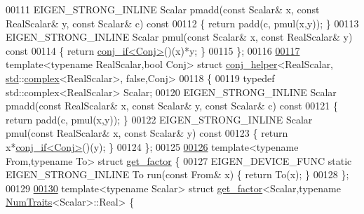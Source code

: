 \begin{DoxyCode}
00111   EIGEN\_STRONG\_INLINE Scalar pmadd(\textcolor{keyword}{const} Scalar& x, \textcolor{keyword}{const} RealScalar& y, \textcolor{keyword}{const} Scalar& c)\textcolor{keyword}{ const}
00112 \textcolor{keyword}{  }\{ \textcolor{keywordflow}{return} padd(c, pmul(x,y)); \}
00113   EIGEN\_STRONG\_INLINE Scalar pmul(\textcolor{keyword}{const} Scalar& x, \textcolor{keyword}{const} RealScalar& y)\textcolor{keyword}{ const}
00114 \textcolor{keyword}{  }\{ \textcolor{keywordflow}{return} \hyperlink{struct_eigen_1_1internal_1_1conj__if}{conj\_if<Conj>}()(x)*y; \}
00115 \};
00116 
\hyperlink{struct_eigen_1_1internal_1_1conj__helper_3_01_real_scalar_00_01std_1_1complex_3_01_real_scalar_01_4_00_01false_00_01_conj_01_4}{00117} \textcolor{keyword}{template}<\textcolor{keyword}{typename} RealScalar,\textcolor{keywordtype}{bool} Conj> \textcolor{keyword}{struct }\hyperlink{struct_eigen_1_1internal_1_1conj__helper}{conj\_helper}<RealScalar, 
      \hyperlink{namespacestd}{std}::\hyperlink{structcomplex}{complex}<RealScalar>, false,Conj>
00118 \{
00119   \textcolor{keyword}{typedef} std::complex<RealScalar> Scalar;
00120   EIGEN\_STRONG\_INLINE Scalar pmadd(\textcolor{keyword}{const} RealScalar& x, \textcolor{keyword}{const} Scalar& y, \textcolor{keyword}{const} Scalar& c)\textcolor{keyword}{ const}
00121 \textcolor{keyword}{  }\{ \textcolor{keywordflow}{return} padd(c, pmul(x,y)); \}
00122   EIGEN\_STRONG\_INLINE Scalar pmul(\textcolor{keyword}{const} RealScalar& x, \textcolor{keyword}{const} Scalar& y)\textcolor{keyword}{ const}
00123 \textcolor{keyword}{  }\{ \textcolor{keywordflow}{return} x*\hyperlink{struct_eigen_1_1internal_1_1conj__if}{conj\_if<Conj>}()(y); \}
00124 \};
00125 
\hyperlink{struct_eigen_1_1internal_1_1get__factor}{00126} \textcolor{keyword}{template}<\textcolor{keyword}{typename} From,\textcolor{keyword}{typename} To> \textcolor{keyword}{struct }\hyperlink{struct_eigen_1_1internal_1_1get__factor}{get\_factor} \{
00127   EIGEN\_DEVICE\_FUNC \textcolor{keyword}{static} EIGEN\_STRONG\_INLINE To run(\textcolor{keyword}{const} From& x) \{ \textcolor{keywordflow}{return} To(x); \}
00128 \};
00129 
\hyperlink{struct_eigen_1_1internal_1_1get__factor_3_01_scalar_00_01typename_01_num_traits_3_01_scalar_01_4_1_1_real_01_4}{00130} \textcolor{keyword}{template}<\textcolor{keyword}{typename} Scalar> \textcolor{keyword}{struct }\hyperlink{struct_eigen_1_1internal_1_1get__factor}{get\_factor}<Scalar,typename \hyperlink{group___core___module_struct_eigen_1_1_num_traits}{NumTraits}<Scalar>::Real> \{

\end{DoxyCode}
